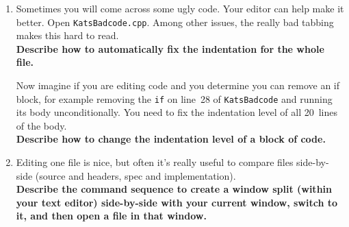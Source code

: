 \documentclass{article}
\begin{document}
\begin{enumerate}
  \item Sometimes you will come across some ugly code. Your editor can help
    make it better. Open \texttt{KatsBadcode.cpp}. Among other issues, the
    really bad tabbing makes this hard to read.\\
    \textbf{Describe how to automatically fix the indentation for the whole file.}
    \vspace{6em}
    
    Now imagine if you are editing code and you determine you can
        remove an if block, for example removing the \texttt{if} on line~28 of
        \texttt{KatsBadcode} and running its body unconditionally. You need to
        fix the indentation level of all 20~lines of the body.\\
        \textbf{Describe how to change the indentation level of a block of code.}
        \vspace{4em}
  \item Editing one file is nice, but often it's really useful to compare
    files side-by-side (source and headers, spec and implementation).\\
    \textbf{Describe the command sequence to create a window split (within your
        text editor) side-by-side with your current window, switch to it, and then open a file in that window.}\\
    \vspace{6em}


\end{enumerate}
\end{document}
